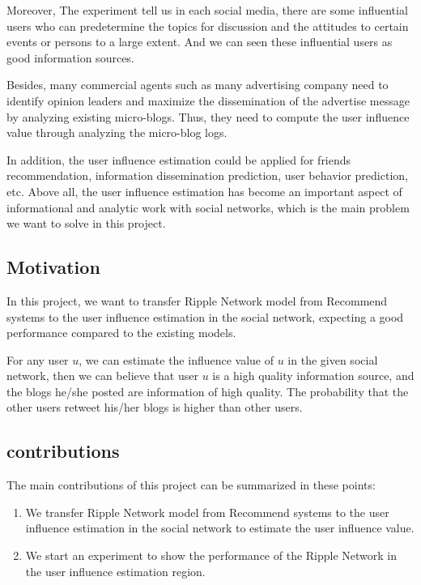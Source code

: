 \documentclass{acmtog} %
\begin{document}
Moreover, The experiment tell us in each social media, there are some influential users who can predetermine the topics for discussion and the attitudes to certain events or persons to a large extent. And we can seen these influential users as good information sources. 

Besides, many commercial agents such as many advertising company need to identify opinion leaders and maximize the dissemination of the advertise message by analyzing existing micro-blogs. Thus, they need to compute the user influence value through analyzing the micro-blog logs.

In addition, the user influence estimation could be applied for friends recommendation, information dissemination prediction, user behavior prediction, etc. Above all, the user influence estimation has become an important aspect of
informational and analytic work with social networks, which is the main problem we want to solve in this project.

\subsection{Motivation}

In this project, we want to transfer Ripple Network\cite{wang2018ripple} model from Recommend systems to the user influence estimation in the social network, expecting a good performance compared to the existing models.

For any user $u$, we can estimate the influence value of $u$ in the given social network, then we can believe that user $u$ is a high quality information source, and the blogs he/she posted are information of high quality. The probability that the other users retweet his/her blogs is higher than other users.

\subsection{contributions}
The main contributions of this project can be summarized in these points:
\begin{enumerate}
    \item We transfer Ripple Network model from Recommend systems to the user influence estimation in the social network to estimate the user influence value.
    \item We start an experiment to show the performance of the Ripple Network in the user influence estimation region.
\end{enumerate}
\end{document}
